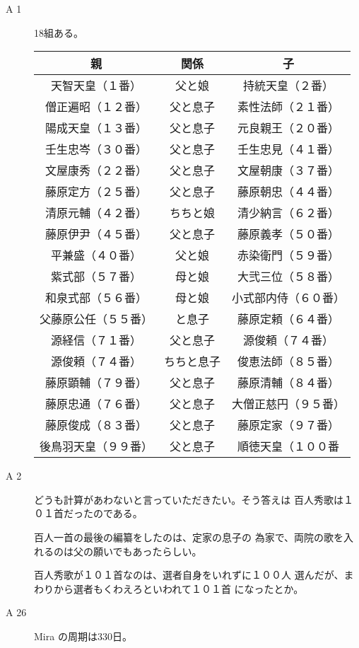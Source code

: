\documentclass[fleqn]{article}
\renewcommand{\arraystretch}{2.4}
\begin{document}
\begin{description}
\item[A 1]{ 18組ある。

{\renewcommand\arraystretch{1.3}
\begin{tabular}{|c|c|c|}
\hline
親&関係&子\\
\hline
天智天皇（１番）&父と娘&持統天皇（２番）\\
\hline
僧正遍昭（１２番）&父と息子&素性法師（２１番）\\
\hline
陽成天皇（１３番）&父と息子&元良親王（２０番）\\
\hline
壬生忠岑（３０番）&父と息子&壬生忠見（４１番）\\
\hline
文屋康秀（２２番）&父と息子&文屋朝康（３７番）\\
\hline
藤原定方（２５番）&父と息子&藤原朝忠（４４番）\\
\hline
清原元輔（４２番）&ちちと娘&清少納言（６２番）\\
\hline
藤原伊尹（４５番）&父と息子&藤原義孝（５０番）\\
\hline
平兼盛（４０番）&父と娘&赤染衛門（５９番）\\
\hline
紫式部（５７番）&母と娘&大弐三位（５８番）\\
\hline
和泉式部（５６番）&母と娘&小式部内侍（６０番）\\
\hline
父藤原公任（５５番）&と息子&藤原定頼（６４番）\\
\hline
源経信（７１番）&父と息子&源俊頼（７４番）\\
\hline
源俊頼（７４番）&ちちと息子&俊恵法師（８５番）\\
\hline
藤原顕輔（７９番）&父と息子&藤原清輔（８４番）\\
\hline
藤原忠通（７６番）&父と息子&大僧正慈円（９５番）\\
\hline
藤原俊成（８３番）&父と息子&藤原定家（９７番）\\
\hline
後鳥羽天皇（９９番）&父と息子&順徳天皇（１００番\\
\hline
\end{tabular}
}}
\item[A 2]{
どうも計算があわないと言っていただきたい。そう答えは
百人秀歌は１０１首だったのである。

百人一首の最後の編纂をしたのは、定家の息子の
為家で、両院の歌を入れるのは父の願いでもあったらしい。

百人秀歌が１０１首なのは、選者自身をいれずに１００人
選んだが、まわりから選者もくわえろといわれて１０１首
になったとか。
}

\item[A 26]{ Mira の周期は330日。
}


\end{description}
\end{document}
